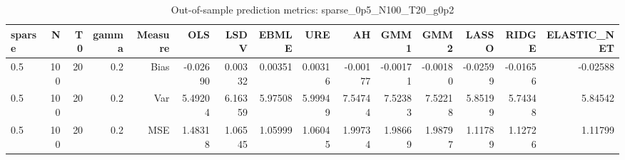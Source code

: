 \begin{table}[!htbp]\centering
\caption{Out-of-sample prediction metrics: sparse_0p5_N100_T20_g0p2}
\label{tab:table3_sparse_0p5_N100_T20_g0p2}
\begin{tabular}{lrrrrrrrrrrrrrr}
\hline
sparse & N & T0 & gamma & Measure & OLS & LSDV & EBMLE & URE & AH & GMM1 & GMM2 & LASSO & RIDGE & ELASTIC_NET \\
\hline
0.5 & 100 & 20 & 0.2 & Bias & -0.02690 & 0.00332 & 0.00351 & 0.00316 & -0.00177 & -0.00171 & -0.00180 & -0.02599 & -0.01656 & -0.02588 \\
0.5 & 100 & 20 & 0.2 & Var & 5.49204 & 6.16359 & 5.97508 & 5.99949 & 7.54744 & 7.52383 & 7.52218 & 5.85199 & 5.74348 & 5.84542 \\
0.5 & 100 & 20 & 0.2 & MSE & 1.48318 & 1.06545 & 1.05999 & 1.06045 & 1.99734 & 1.98669 & 1.98797 & 1.11789 & 1.12726 & 1.11799 \\
\hline
\end{tabular}
\end{table}

